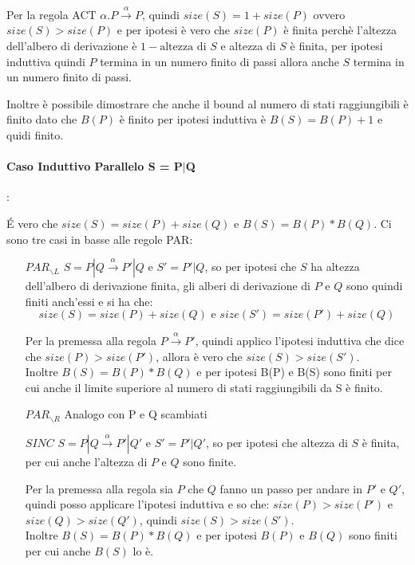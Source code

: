 \documentclass{article}
\newcommand{\passo}{\xrightarrow{\alpha}}
\begin{document}
Per la regola ACT $\alpha.P \xrightarrow{\alpha}P$, quindi  $size(S) = 1+ size(P)$ ovvero $size(S)>size(P)$ e per ipotesi è vero che $size(P)$ è finita perchè l'altezza dell'albero di derivazione è $1- \text{altezza di } S$ e altezza di $S$ è finita, per ipotesi induttiva quindi $P$ termina in un numero finito di passi allora anche $S$ termina in un numero finito di passi.


Inoltre è possibile dimostrare che anche il bound al numero di stati raggiungibili è finito dato che $B(P)$ è finito per ipotesi induttiva è $B(S) = B(P)+1$ e quidi finito.

\paragraph{Caso Induttivo Parallelo S = P$|$Q}:

É vero che 
$size(S) = size(P) + size(Q) $ e $B(S) = B(P) * B(Q)$. Ci sono tre casi in basse alle regole PAR:

\begin{itemize}
    \item[$PAR_{\backslash L}$] $S = P|Q \xrightarrow{\alpha} P'|Q$ e $S'=P'|Q$, so per ipotesi che $S$ ha altezza dell'albero di derivazione finita, gli alberi di derivazione di $P$ e $Q$ sono quindi finiti anch'essi e si ha che: 
    $$size(S)=size(P)+size(Q) \text{ e } size(S')=size(P')+size(Q)$$

Per la premessa alla regola $P \passo P'$, quindi applico l'ipotesi induttiva che dice che $size(P)>size(P')$, allora è vero che $size(S)>size(S')$.  \\   
        
        
Inoltre $B(S) = B(P)*B(Q)$  e per ipotesi B(P) e B(S) sono finiti per cui anche il limite superiore al numero di stati raggiungibili da S è finito.
    
     \item[$PAR_{\backslash R}$] Analogo con P e Q scambiati
     
     \item[$SINC$] $S = P|Q \xrightarrow{\alpha} P'|Q'$ e $S'=P'|Q'$, so per ipotesi che altezza di $S$ è finita, per cui anche l'altezza di $P$ e $Q$ sono finite. 
     
Per la premessa alla regola sia $P$ che $Q$ fanno un passo per andare in $P'$ e $Q'$, quindi posso applicare l'ipotesi induttiva e so che: $ size(P)>size(P')$ e $size(Q)>size(Q')$, quindi $size(S)>size(S')$.\\ 
     
     Inoltre $B(S) = B(P) * B(Q)$ e per ipotesi $B(P)$ e $B(Q)$ sono finiti per cui anche $B(S)$ lo è.
\end{itemize}
\end{document}
